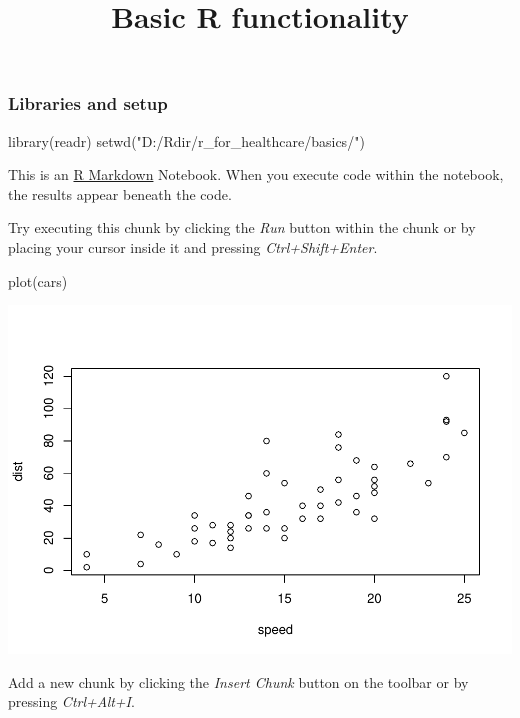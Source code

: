 \documentclass[]{article}
\title{Basic R functionality}
\author{}
\date{}
\newenvironment{Shaded}{\begin{snugshade}}{\end{snugshade}}
\newcommand{\FunctionTok}[1]{\textcolor[rgb]{0.00,0.00,0.00}{#1}}
\newcommand{\NormalTok}[1]{#1}
\newcommand{\StringTok}[1]{\textcolor[rgb]{0.31,0.60,0.02}{#1}}
\begin{document}
\maketitle

\hypertarget{libraries-and-setup}{%
\subsubsection{Libraries and setup}\label{libraries-and-setup}}

\begin{Shaded}
\begin{Highlighting}[]
\FunctionTok{library}\NormalTok{(readr)}
\FunctionTok{setwd}\NormalTok{(}\StringTok{"D:/Rdir/r\_for\_healthcare/basics/"}\NormalTok{)}
\end{Highlighting}
\end{Shaded}

This is an \href{http://rmarkdown.rstudio.com}{R Markdown} Notebook.
When you execute code within the notebook, the results appear beneath
the code.

Try executing this chunk by clicking the \emph{Run} button within the
chunk or by placing your cursor inside it and pressing
\emph{Ctrl+Shift+Enter}.

\begin{Shaded}
\begin{Highlighting}[]
\FunctionTok{plot}\NormalTok{(cars)}
\end{Highlighting}
\end{Shaded}

\includegraphics{basics_files/figure-latex/unnamed-chunk-2-1.pdf}

Add a new chunk by clicking the \emph{Insert Chunk} button on the
toolbar or by pressing \emph{Ctrl+Alt+I}.
\end{document}
